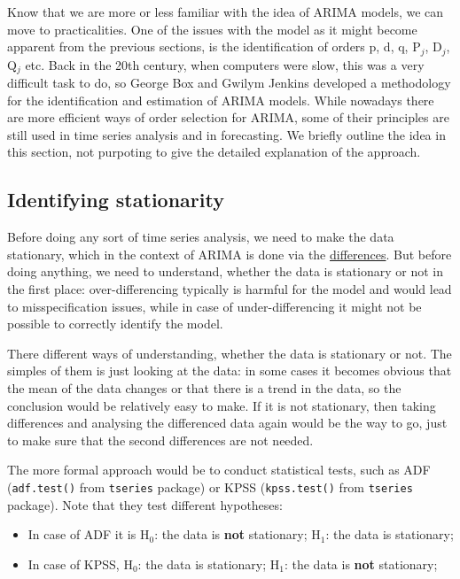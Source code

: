 \documentclass[
]{book}
\providecommand{\tightlist}{%
  \setlength{\itemsep}{0pt}\setlength{\parskip}{0pt}}
\theoremstyle{definition}
\theoremstyle{definition}
\theoremstyle{definition}
\theoremstyle{definition}
\theoremstyle{remark}
\begin{document}
Know that we are more or less familiar with the idea of ARIMA models, we can move to practicalities. One of the issues with the model as it might become apparent from the previous sections, is the identification of orders p, d, q, P\(_j\), D\(_j\), Q\(_j\) etc. Back in the 20th century, when computers were slow, this was a very difficult task to do, so George Box and Gwilym Jenkins \citep{Box1976} developed a methodology for the identification and estimation of ARIMA models. While nowadays there are more efficient ways of order selection for ARIMA, some of their principles are still used in time series analysis and in forecasting. We briefly outline the idea in this section, not purpoting to give the detailed explanation of the approach.

\hypertarget{identifying-stationarity}{%
\subsection{Identifying stationarity}\label{identifying-stationarity}}

Before doing any sort of time series analysis, we need to make the data stationary, which in the context of ARIMA is done via the \protect\hyperlink{Differences}{differences}. But before doing anything, we need to understand, whether the data is stationary or not in the first place: over-differencing typically is harmful for the model and would lead to misspecification issues, while in case of under-differencing it might not be possible to correctly identify the model.

There different ways of understanding, whether the data is stationary or not. The simples of them is just looking at the data: in some cases it becomes obvious that the mean of the data changes or that there is a trend in the data, so the conclusion would be relatively easy to make. If it is not stationary, then taking differences and analysing the differenced data again would be the way to go, just to make sure that the second differences are not needed.

The more formal approach would be to conduct statistical tests, such as ADF (\texttt{adf.test()} from \texttt{tseries} package) or KPSS (\texttt{kpss.test()} from \texttt{tseries} package). Note that they test different hypotheses:

\begin{itemize}
\tightlist
\item
  In case of ADF it is H\(_0\): the data is \textbf{not} stationary; H\(_1\): the data is stationary;
\item
  In case of KPSS, H\(_0\): the data is stationary; H\(_1\): the data is \textbf{not} stationary;
\end{itemize}
\end{document}
